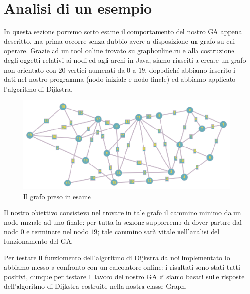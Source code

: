 \section{Analisi di un esempio}
In questa sezione porremo sotto esame il comportamento del nostro GA appena descritto, ma prima occorre senza dubbio avere a disposizione un grafo su cui operare. Grazie ad un tool online trovato su graphonline.ru e alla costruzione degli oggetti relativi ai nodi ed agli archi in Java, siamo riusciti a creare un grafo non orientato con $20$ vertici numerati da $0$ a $19$, dopodich\'e abbiamo inserito i dati nel nostro programma (nodo iniziale e nodo finale) ed abbiamo applicato l'algoritmo di Dijkstra.
\begin{figure}[H]
    \centering
    \hfill
    \includegraphics[width=1\textwidth]{Images/graph.png}
    \hspace*{\fill}
    \caption{Il grafo preso in esame}
    \label{fig:graph}
\end{figure}
Il nostro obiettivo consisteva nel trovare in tale grafo il cammino minimo da un nodo iniziale ad uno finale: per tutta la sezione supporremo di dover partire dal nodo $0$ e terminare nel nodo $19$; tale cammino sar\`a vitale nell'analisi del funzionamento del GA.
\vspace{3mm}

Per testare il funziomento dell'algoritmo di Dijkstra da noi implementato lo abbiamo messo a confronto con un calcolatore online: i risultati sono stati tutti positivi, dunque per testare il lavoro del nostro GA ci siamo basati sulle risposte dell'algoritmo di Dijkstra costruito nella nostra classe Graph.

